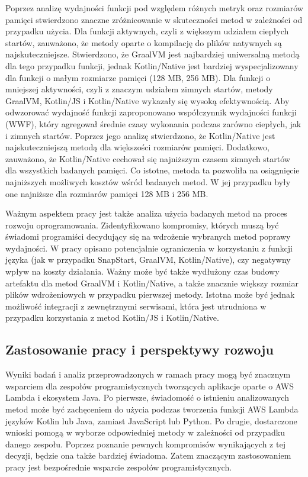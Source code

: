 Poprzez analizę wydajności funkcji pod względem różnych metryk oraz rozmiarów pamięci stwierdzono znaczne zróżnicowanie w skuteczności metod w zależności od przypadku użycia.
Dla funkcji aktywnych, czyli z większym udziałem ciepłych startów, zauważono, że metody oparte o kompilację do plików natywnych są najskuteczniejsze.
Stwierdzono, że GraalVM jest najbardziej uniwersalną metodą dla tego przypadku funkcji, jednak Kotlin/Native jest bardziej wyspecjalizowany dla funkcji o małym rozmiarze pamięci (128 MB, 256 MB).
Dla funkcji o mniejszej aktywności, czyli z znaczym udziałem zimnych startów, metody GraalVM, Kotlin/JS i Kotlin/Native wykazały się wysoką efektywnością.
Aby odwzorować wydajność funkcji zaproponowano współczynnik wydajności funkcji (WWF), który agregował średnie czasy wykonania podczas zarówno ciepłych, jak i zimnych startów.
Poprzez jego analizę stwierdzono, że Kotlin/Native jest najskuteczniejszą metodą dla większości rozmiarów pamięci.
Dodatkowo, zauważono, że Kotlin/Native cechował się najniższym czasem zimnych startów dla wszystkich badanych pamięci.
Co istotne, metoda ta pozwoliła na osiągnięcie najniższych możliwych kosztów wśród badanych metod.
W jej przypadku były one najniższe dla rozmiarów pamięci 128 MB i 256 MB.

Ważnym aspektem pracy jest także analiza użycia badanych metod na proces rozwoju oprogramowania.
Zidentyfikowano kompromisy, których muszą być świadomi programiści decydujący się na wdrożenie wybranych metod poprawy wydajności.
W pracy opisano potencjalnie ograniczenia w korzystaniu z funkcji języka (jak w przypadku SnapStart, GraalVM, Kotlin/Native), czy negatywny wpływ na koszty działania.
Ważny może być także wydłużony czas budowy artefaktu dla metod GraalVM i Kotlin/Native, a także znacznie większy rozmiar plików wdrożeniowych w przypadku pierwszej metody.
Istotna może być jednak możliwość integracji z zewnętrznymi serwisami, która jest utrudniona w przypadku korzystania z metod Kotlin/JS i Kotlin/Native.

\subsection*{Zastosowanie pracy i perspektywy rozwoju}

Wyniki badań i analiz przeprowadzonych w ramach pracy mogą być znacznym wsparciem dla zespołów programistycznych tworzących aplikacje oparte o AWS Lambda i ekosystem Java.
Po pierwsze, świadomość o istnieniu analizowanych metod może być zachęceniem do użycia podczas tworzenia funkcji AWS Lambda języków Kotlin lub Java, zamiast JavaScript lub Python.
Po drugie, dostarczone wnioski pomogą w wyborze odpowiedniej metody w zależności od przypadku danego zespołu.
Poprzez poznanie pewnych kompromisów wynikających z tej decyzji, będzie ona także bardziej świadoma.
Zatem znaczącym zastosowaniem pracy jest bezpośrednie wsparcie zespołów programistycznych.

